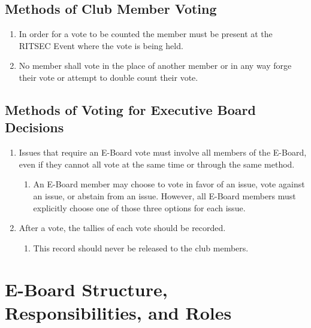 \documentclass{article}
\begin{document}
\subsection{Methods of Club Member Voting}

\begin{enumerate}
  \item In order for a vote to be counted the member must be present at the
    RITSEC Event where the vote is being held.
  \item No member shall vote in the place of another member or in any way forge
    their vote or attempt to double count their vote.
\end{enumerate}

\subsection{Methods of Voting for Executive Board Decisions}

\begin{enumerate}
  \item Issues that require an E-Board vote must involve all members of the
    E-Board, even if they cannot all vote at the same time or through the same
    method.
  \begin{enumerate}
    \item An E-Board member may choose to vote in favor of an issue, vote
      against an issue, or abstain from an issue.  However, all E-Board members
      must explicitly choose one of those three options for each issue.
  \end{enumerate}
  \item After a vote, the tallies of each vote should be recorded.
  \begin{enumerate}
    \item This record should never be released to the club members.
  \end{enumerate}
\end{enumerate}


\section{E-Board Structure, Responsibilities, and Roles}
\end{document}

